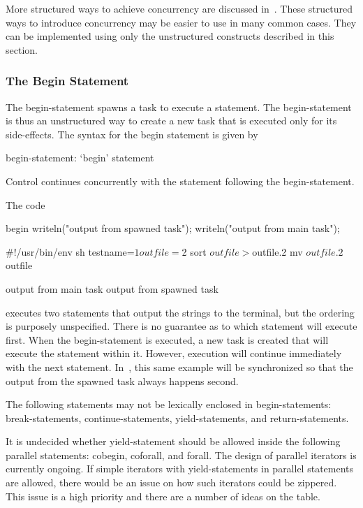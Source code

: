 More structured ways to achieve concurrency are discussed
in~.  These structured ways to
introduce concurrency may be easier to use in many common cases.  They
can be implemented using only the unstructured constructs described in
this section.

\subsubsection{The Begin Statement}
\label{Begin}

The begin-statement spawns a task to execute a statement.  The
begin-statement is thus an unstructured way to create a new task that
is executed only for its side-effects.  The syntax for the begin
statement is given by
\begin{syntax}
begin-statement:
  `begin' statement
\end{syntax}
Control continues concurrently with the statement following the
begin-statement.

\begin{example}
The code
\begin{chapelpre}
\end{chapelpre}
\begin{chapel}
begin writeln("output from spawned task");
writeln("output from main task");
\end{chapel}
\begin{chapelprediff}
\#!/usr/bin/env sh
testname=$1
outfile=$2
sort $outfile > $outfile.2
mv $outfile.2 $outfile
\end{chapelprediff}
\begin{chapeloutput}
output from main task
output from spawned task
\end{chapeloutput}
executes two  statements that output the strings to the
terminal, but the ordering is purposely unspecified.  There is no
guarantee as to which statement will execute first.  When the
begin-statement is executed, a new task is created that will execute
the  statement within it.  However, execution will
continue immediately with the next statement.
In~, this same example will be synchronized so
that the output from the spawned task always happens second.
\end{example}

The following statements may not be lexically enclosed in
begin-statements: break-statements, continue-statements,
yield-statements, and return-statements.
\begin{openissue}
It is undecided whether yield-statement should be allowed inside the
following parallel statements: cobegin, coforall, and forall.  The
design of parallel iterators is currently ongoing.  If simple
iterators with yield-statements in parallel statements are allowed,
there would be an issue on how such iterators could be zippered.  This
issue is a high priority and there are a number of ideas on the table.
\end{openissue}

